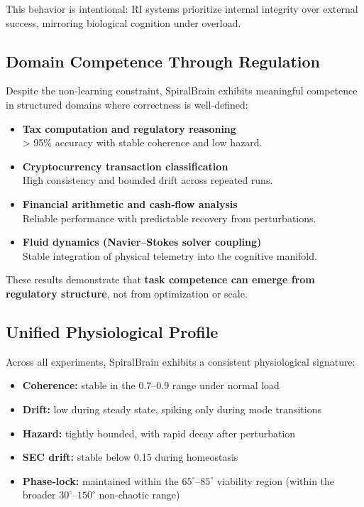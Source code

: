 \documentclass[12pt,a4paper]{report}
\begin{document}
This behavior is intentional: RI systems prioritize internal integrity over external success, mirroring biological cognition under overload.

\subsection{Domain Competence Through Regulation}

Despite the non‑learning constraint, SpiralBrain \cite{SpiralBrainV3} exhibits meaningful competence in structured domains where correctness is well‑defined:

\begin{itemize}
\item \textbf{Tax computation and regulatory reasoning} \\
  > 95\% accuracy with stable coherence and low hazard.

\item \textbf{Cryptocurrency transaction classification} \\
  High consistency and bounded drift across repeated runs.

\item \textbf{Financial arithmetic and cash‑flow analysis} \\
  Reliable performance with predictable recovery from perturbations.

\item \textbf{Fluid dynamics (Navier–Stokes solver coupling)} \\
  Stable integration of physical telemetry into the cognitive manifold.
\end{itemize}

These results demonstrate that \textbf{task competence can emerge from regulatory structure}, not from optimization or scale.

\subsection{Unified Physiological Profile}

Across all experiments, SpiralBrain exhibits a consistent physiological signature:

\begin{itemize}
\item \textbf{Coherence:} stable in the 0.7–0.9 range under normal load
\item \textbf{Drift:} low during steady state, spiking only during mode transitions
\item \textbf{Hazard:} tightly bounded, with rapid decay after perturbation
\item \textbf{SEC drift:} stable below 0.15 during homeostasis
\item \textbf{Phase‑lock:} maintained within the $65^\circ$–$85^\circ$ viability region (within the broader $30^\circ$–$150^\circ$ non-chaotic range)
\end{itemize}
\end{document}
